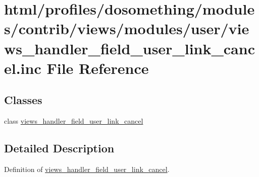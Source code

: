 \hypertarget{views__handler__field__user__link__cancel_8inc}{
\section{html/profiles/dosomething/modules/contrib/views/modules/user/views\_\-handler\_\-field\_\-user\_\-link\_\-cancel.inc File Reference}
\label{views__handler__field__user__link__cancel_8inc}
}
\subsection*{Classes}
\begin{DoxyCompactItemize}
\item 
class \hyperlink{classviews__handler__field__user__link__cancel}{views\_\-handler\_\-field\_\-user\_\-link\_\-cancel}
\end{DoxyCompactItemize}


\subsection{Detailed Description}
Definition of \hyperlink{classviews__handler__field__user__link__cancel}{views\_\-handler\_\-field\_\-user\_\-link\_\-cancel}. 